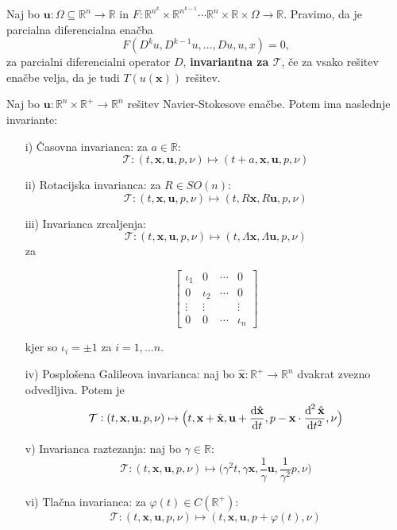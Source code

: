 \documentclass[mat2, tisk]{fmfdelo}
\newcommand{\R}{\mathbb R}
\newcommand{\bd}{\textbf}
\begin{document}
\begin{definicija}
Naj bo $\bd{u}: \Omega \subseteq \R^n \rightarrow \R$ in 
$F: \R^{n^k} \times \R^{n^{k-1}} \cdots \R^n \times \R \times \Omega \rightarrow \R$. 
Pravimo, da je parcialna diferencialna enačba 
$$
F(D^k u, D^{k-1}u, \dots, D u, u, x) = 0,
$$
za parcialni diferencialni operator $D$, \bd{invariantna za $\mathcal{T}$}, če za 
vsako rešitev enačbe velja, da je tudi $T(u(\bd{x}))$ rešitev.
\end{definicija}

\begin{trditev}
Naj bo $\bd{u}: \R^n \times \R^+ \rightarrow \R^n$ rešitev Navier-Stokesove enačbe. 
Potem ima naslednje invariante: 
\begin{enumerate}
  \item[i)] Časovna invarianca: za $a\in \R$: $$\mathcal{T}: (t, \bd{x}, \bd{u}, p, \nu) \mapsto (t + a, \bd{x}, \bd{u}, p, \nu)$$
  \item[ii)] Rotacijska invarianca: za $R \in SO(n)$: $$\mathcal{T}: (t, \bd{x}, \bd{u}, p, \nu) \mapsto (t, R\bd{x}, R\bd{u}, p, \nu)$$
  \item[iii)] Invarianca zrcaljenja: $$ \mathcal{T}: (t, \bd{x}, \bd{u}, p, \nu) \mapsto (t, \Lambda\bd{x}, \Lambda \bd{u}, p, \nu)$$
  za 

\[ \begin{bmatrix}
   \iota_1 & 0 & \cdots & 0 \\
   0 & \iota_2 & \cdots & 0 \\
   \vdots  & \vdots  &  & \vdots  \\
   0 & 0 & \cdots & \iota_n
 \end{bmatrix} \]

 kjer so $\iota_i = \pm 1$ za $i = 1, \dots n$.
  \item[iv)] Posplošena Galileova invarianca: naj bo $\hat{\bd{x}}: \R^+ \rightarrow \R^n$ dvakrat zvezno odvedljiva. Potem je 
  $$\mathcal{T}: (t, \bd{x}, \bd{u}, p, \nu) \mapsto \big(t, \bd{x} + \hat{\bd{x}}, \bd{u} + \frac{\dif \hat{\bd{x}}}{\dif t}, p - \bd{x} \cdot \frac{\dif^{\,2} \hat{\bd{x}}}{\dif t^2}, \nu\big)$$
  \item[v)] Invarianca raztezanja: naj bo $\gamma\in \R$: 
  $$\mathcal{T}: (t, \bd{x}, \bd{u}, p, \nu) \mapsto \big(\gamma^2 t, \gamma\bd{x}, \frac{1}{\gamma} \bd{u}, \frac{1}{\gamma^2} p, \nu\big)$$
  \item[vi)] Tlačna invarianca: za $\varphi(t) \in C(\R^+)$: 
  $$\mathcal{T}: (t, \bd{x}, \bd{u}, p, \nu) \mapsto (t, \bd{x}, \bd{u}, p + \varphi(t), \nu) $$
\end{enumerate}
\end{trditev}
\end{document}
